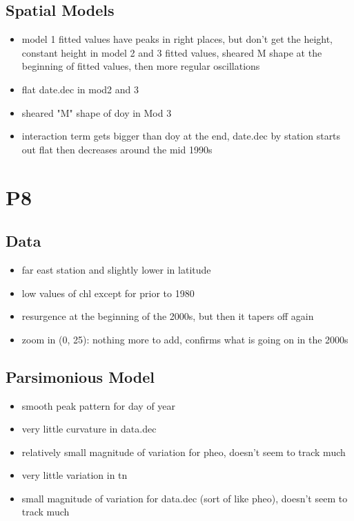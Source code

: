 \documentclass[12pt]{amsart}
\begin{document}
\subsection{Spatial Models}

\begin{itemize}
\item model 1 fitted values have peaks in right places, but don't get the height, constant height in model 2 and 3 fitted values, sheared M shape at the beginning of fitted values, then more regular oscillations
\item flat date.dec in mod2 and 3
\item sheared "M" shape of doy in Mod 3
\item interaction term gets bigger than doy at the end, date.dec by station starts out flat then decreases around the mid 1990s
\end{itemize}


\section{P8}
\subsection{Data}
\begin{itemize}
\item far east station and slightly lower in latitude
\item low values of chl except for prior to 1980
\item resurgence at the beginning of the 2000s, but then it tapers off again
\item zoom in (0, 25): nothing more to add, confirms what is going on in the 2000s
\end{itemize}
\subsection{Parsimonious Model}
\begin{itemize}
\item smooth peak pattern for day of year
\item very little curvature in data.dec
\item relatively small magnitude of variation for pheo, doesn't seem to track much
\item very little variation in tn
\item small magnitude of variation for data.dec (sort of like pheo), doesn't seem to track much
\end{itemize}
\end{document}
